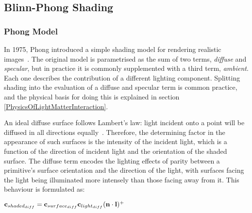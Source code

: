 \subsection{Blinn-Phong Shading} \label{BlinnPhongShading}

\subsubsection{Phong Model}

In 1975, Phong introduced a simple shading model for rendering realistic images~\cite{PhongShading}. The original model is parametrised as the sum of two terms, \textit{diffuse} and \textit{specular}, but in practice it is commonly supplemented with a third term, \textit{ambient}. Each one describes the contribution of a different lighting component. Splitting shading into the evaluation of a diffuse and specular term is common practice, and the physical basis for doing this is explained in section \ref{PhysicsOfLightMatterInteraction}.

An ideal diffuse surface follows Lambert's law: light incident onto a point will be diffused in all directions equally~\cite{Lambert}. Therefore, the determining factor in the appearance of such surfaces is the intensity of the incident light, which is a function of the direction of incident light and the orientation of the shaded surface. The diffuse term encodes the lighting effects of parity between a primitive's surface orientation and the direction of the light, with surfaces facing the light being illuminated more intensely than those facing away from it. This behaviour is formulated as:

\begin{center}
	\begin{math}\mathbf{c}_{shaded_{diff}} = \mathbf{c}_{surface_{diff}}\mathbf{c}_{light_{diff}}(\mathbf{n}\cdot\mathbf{l})^+\end{math}
\end{center}

